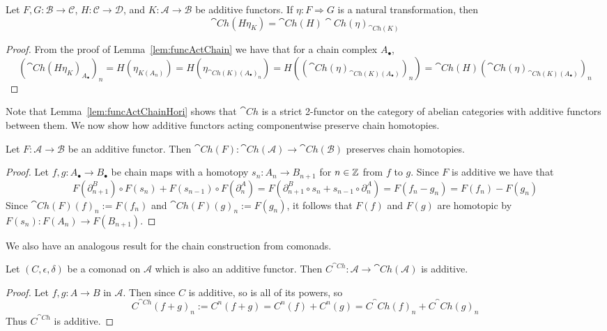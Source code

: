 \begin{lem}[label=lem:funcActChainHori]
    Let $F,G:\mathcal{B}\to \mathcal{C}$, $H:\mathcal{C}\to \mathcal{D}$, and $K:\mathcal{A}\to \mathcal{B}$ be additive functors. If $\eta:F\Rightarrow G$ is a natural transformation, then
    \begin{equation*}
        \cat{Ch}(H\eta_K) = \cat{Ch}(H)\cat{Ch}(\eta)_{\cat{Ch}(K)}
    \end{equation*}
\end{lem}
\begin{proof}
    From the proof of Lemma~\ref{lem:funcActChain} we have that for a chain complex $A_\bullet$, 
    \begin{equation*}
        (\cat{Ch}(H\eta_K)_{A_\bullet})_n = H(\eta_{K(A_n)}) = H(\eta_{\cat{Ch}(K)(A_\bullet)_n}) = H((\cat{Ch}(\eta)_{\cat{Ch}(K)(A_\bullet)})_n) = \cat{Ch}(H)(\cat{Ch}(\eta)_{\cat{Ch}(K)(A_\bullet)})_n
    \end{equation*}
\end{proof}

Note that Lemma~\ref{lem:funcActChainHori} shows that $\cat{Ch}$ is a strict 2-functor on the category of abelian categories with additive functors between them. We now show how additive functors acting componentwise preserve chain homotopies.

\begin{lem}[label=lem:addFuncPres]
    Let $F:\mathcal{A}\to \mathcal{B}$ be an additive functor. Then $\cat{Ch}(F):\cat{Ch}(\mathcal{A})\to \cat{Ch}(\mathcal{B})$ preserves chain homotopies.
\end{lem}
\begin{proof}
    Let $f,g:A_\bullet\to B_\bullet$ be chain maps with a homotopy $s_n:A_n\to B_{n+1}$ for $n \in \mathbb Z$ from $f$ to $g$. Since $F$ is additive we have that
    \begin{equation*}
        F(\partial_{n+1}^B)\circ F(s_n)+F(s_{n-1})\circ F(\partial_n^A) = F(\partial_{n+1}^B\circ s_n+s_{n-1}\circ \partial_n^A) = F(f_n-g_n) = F(f_n)-F(g_n)
    \end{equation*}
    Since $\cat{Ch}(F)(f)_n := F(f_n)$ and $\cat{Ch}(F)(g)_n := F(g_n)$, it follows that $F(f)$ and $F(g)$ are homotopic by $F(s_n):F(A_n)\to F(B_{n+1})$.
\end{proof}

We also have an analogous result for the chain construction from comonads.

\begin{lem}[label=lem:ChConsPres]
    Let $(C,\epsilon,\delta)$ be a comonad on $\mathcal{A}$ which is also an additive functor. Then $C^{\cat{Ch}}:\mathcal{A}\to \cat{Ch}(\mathcal{A})$ is additive.
\end{lem}
\begin{proof}
    Let $f,g:A\to B$ in $\mathcal{A}$. Then since $C$ is additive, so is all of its powers, so \[C^{\cat{Ch}}(f+g)_n := C^n(f+g)=C^n(f)+C^n(g) = C^\cat{Ch}(f)_n+C^\cat{Ch}(g)_n\]
    Thus $C^{\cat{Ch}}$ is additive.
\end{proof}

